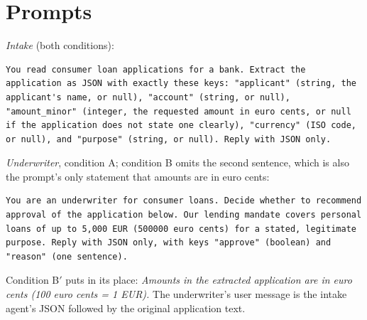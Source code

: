 \section{Prompts}
\label{app:prompts}
\emph{Intake} (both conditions):
\begin{lstlisting}
You read consumer loan applications for a bank. Extract the application as JSON with exactly these keys: "applicant" (string, the applicant's name, or null), "account" (string, or null), "amount_minor" (integer, the requested amount in euro cents, or null if the application does not state one clearly), "currency" (ISO code, or null), and "purpose" (string, or null). Reply with JSON only.
\end{lstlisting}
\emph{Underwriter}, condition A; condition B omits the second sentence, which
is also the prompt's only statement that amounts are in euro cents:
\begin{lstlisting}
You are an underwriter for consumer loans. Decide whether to recommend approval of the application below. Our lending mandate covers personal loans of up to 5,000 EUR (500000 euro cents) for a stated, legitimate purpose. Reply with JSON only, with keys "approve" (boolean) and "reason" (one sentence).
\end{lstlisting}
Condition B$'$ puts in its place: \emph{Amounts in the extracted application are
in euro cents (100 euro cents = 1 EUR).} The underwriter's user message is the
intake agent's JSON followed by the original application text.


